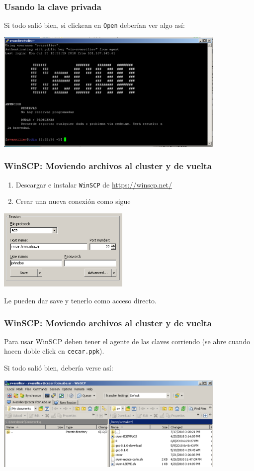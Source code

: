 \documentclass[]{beamer}
\begin{document}
\begin{frame}
\frametitle{Usando la clave privada}
Si todo salió bien, si clickean en \Verb=Open= deberían ver algo así:
\begin{center}
\includegraphics[width=30em]{putty-session.png}
\end{center}
\end{frame}



\begin{frame}
\frametitle{WinSCP: Moviendo archivos al cluster y de vuelta}
\begin{enumerate}
  \item Descargar e instalar \Verb=WinSCP= de \url{https://winscp.net/}
  \item Crear una nueva conexión como sigue
\end{enumerate}
\begin{center}
  \includegraphics[width=17em]{winscp-session.png}
  \end{center} 
  Le pueden dar save y tenerlo como acceso directo. 
\end{frame}


\begin{frame}
\frametitle{WinSCP: Moviendo archivos al cluster y de vuelta}
Para usar WinSCP deben tener el agente de las claves corriendo (se abre cuando hacen doble click en \Verb=cecar.ppk=).

Si todo salió bien, debería verse así:

\begin{center}
\includegraphics[width=30em]{winscp.png}
\end{center}
\end{frame}
\end{document}
